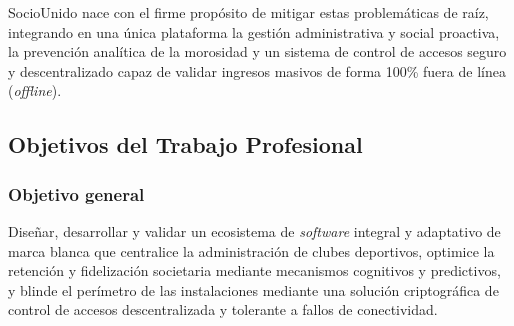 SocioUnido nace con el firme propósito de mitigar estas problemáticas de raíz, integrando en una única plataforma la gestión administrativa y social proactiva, la prevención analítica de la morosidad y un sistema de control de accesos seguro y descentralizado capaz de validar ingresos masivos de forma 100\% fuera de línea (\textit{offline}).

\subsection{Objetivos del Trabajo Profesional}

\subsubsection{Objetivo general}
Diseñar, desarrollar y validar un ecosistema de \textit{software} integral y adaptativo de marca blanca que centralice la administración de clubes deportivos, optimice la retención y fidelización societaria mediante mecanismos cognitivos y predictivos, y blinde el perímetro de las instalaciones mediante una solución criptográfica de control de accesos descentralizada y tolerante a fallos de conectividad.

